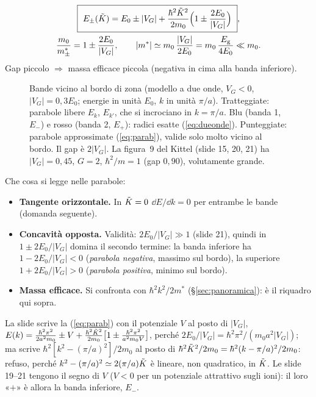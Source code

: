 \documentclass[11pt,a4paper]{article}
\begin{document}
\begin{chiave}
\begin{gather*}
\boxed{\ E_\pm(\Kt)=E_0\pm|V_G|+\frac{\hbar^2\Kt^2}{2m_0}\Bigl(1\pm\frac{2E_0}{|V_G|}\Bigr)\ },\\
\frac{m_0}{m^*_\pm}=1\pm\frac{2E_0}{|V_G|},\qquad |m^*|\simeq m_0\,\frac{|V_G|}{2E_0}=m_0\,\frac{\Eg}{4E_0}\ll m_0 .
\end{gather*}
Gap piccolo $\Rightarrow$ massa efficace piccola (negativa in cima alla banda inferiore).
\end{chiave}

\begin{figure}[tbp]
\centering
{}
\caption{Bande vicino al bordo di zona (modello a due onde, $V_G<0$, $|V_G|=0{,}3E_0$; energie in unità $E_0$, $k$ in unità $\pi/a$). Tratteggiate: parabole libere $E_k$, $E_{k'}$, che si
incrociano in $k=\pi/a$. Blu (banda 1, $E_-$) e rosso (banda 2, $E_+$): radici esatte (\ref{eq:dueonde}). Punteggiate: parabole approssimate (\ref{eq:parab}), valide solo molto vicino al bordo. Il gap è $2|V_G|$. La figura~9 del Kittel
(slide 15, 20, 21) ha $|V_G|=0{,}45$, $G=2$, $\hbar^2/m=1$ (gap $0{,}90$), volutamente grande.}\label{fig:qfbordo}
\end{figure}

Che cosa si legge nelle parabole:
\begin{itemize}[leftmargin=*]
\item \textbf{Tangente orizzontale.} In $\tilde K=0$ $\dd E/\dd k=0$ per entrambe le bande (domanda seguente).
\item \textbf{Concavità opposta.} Validità: $2E_0/|V_G|\gg1$ (slide 21), quindi in $1\pm2E_0/|V_G|$ domina il secondo termine: la banda inferiore ha $1-2E_0/|V_G|<0$ (\emph{parabola negativa}, massimo sul bordo),
la superiore $1+2E_0/|V_G|>0$ (\emph{parabola positiva}, minimo sul bordo).
\item \textbf{Massa efficace.} Si confronta con $\hbar^2k^2/2m^*$ (§\ref{sec:panoramica}): è il riquadro qui sopra.
\end{itemize}

\begin{osservazione}
La slide scrive la (\ref{eq:parab}) con il potenziale $V$ al posto di $|V_G|$, $E(k)=\frac{\hbar^2\pi^2}{2a^2m_0}\pm V+\frac{\hbar^2\tilde K^2}{2m_0}\bigl[1\pm\frac{\hbar^2\pi^2}{a^2m_0V}\bigr]$, perché
$2E_0/|V_G|=\hbar^2\pi^2/(m_0a^2|V_G|)$; ma scrive $\hbar^2[k^2-(\pi/a)^2]/2m_0$ al posto di $\hbar^2\tilde K^2/2m_0=\hbar^2(k-\pi/a)^2/2m_0$: refuso, perché $k^2-(\pi/a)^2\simeq2(\pi/a)\tilde K$ è lineare, non
quadratico, in $\tilde K$. Le slide 19--21 tengono il segno di $V$ ($V<0$ per un potenziale attrattivo sugli ioni): il loro «$+$» è allora la banda inferiore, $E_-$.
\end{osservazione}
\end{document}
